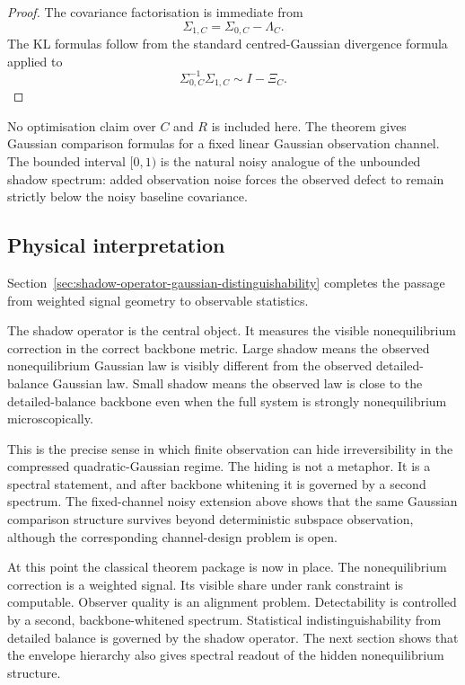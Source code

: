 \documentclass[11pt,a4paper]{article}
\numberwithin{equation}{section}
\theoremstyle{thmcompact}
\theoremstyle{remark}
\begin{document}
\begin{proof}
The covariance factorisation is immediate from
\begin{equation}
\Sigma_{1,C}=\Sigma_{0,C}-\Lambda_C.
\end{equation}
The KL formulas follow from the standard centred-Gaussian divergence formula applied to
\begin{equation}
\Sigma_{0,C}^{-1}\Sigma_{1,C}\sim I-\Xi_C.
\end{equation}
\end{proof}

No optimisation claim over \(C\) and \(R\) is included here. The theorem gives Gaussian comparison formulas for a fixed linear Gaussian observation channel. The bounded interval \([0,1)\) is the natural noisy analogue of the unbounded shadow spectrum: added observation noise forces the observed defect to remain strictly below the noisy baseline covariance.

\subsection{Physical interpretation}

Section~\ref{sec:shadow-operator-gaussian-distinguishability} completes the passage from weighted signal geometry to observable statistics.

The shadow operator is the central object. It measures the visible nonequilibrium correction in the correct backbone metric. Large shadow means the observed nonequilibrium Gaussian law is visibly different from the observed detailed-balance Gaussian law. Small shadow means the observed law is close to the detailed-balance backbone even when the full system is strongly nonequilibrium microscopically.

This is the precise sense in which finite observation can hide irreversibility in the compressed quadratic-Gaussian regime. The hiding is not a metaphor. It is a spectral statement, and after backbone whitening it is governed by a second spectrum. The fixed-channel noisy extension above shows that the same Gaussian comparison structure survives beyond deterministic subspace observation, although the corresponding channel-design problem is open.

At this point the classical theorem package is now in place. The nonequilibrium correction is a weighted signal. Its visible share under rank constraint is computable. Observer quality is an alignment problem. Detectability is controlled by a second, backbone-whitened spectrum. Statistical indistinguishability from detailed balance is governed by the shadow operator. The next section shows that the envelope hierarchy also gives spectral readout of the hidden nonequilibrium structure.
\end{document}
